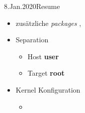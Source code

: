 \documentclass{beamer}
\begin{document}
\begin{frame}{8.Jan.2020}{Resume}
 \begin{itemize}
  \item zusätzliche {\em packages} , 
  \item Separation
  \begin{itemize}
   \item Host {\bf user}
   \item Target {\bf root}
  \end{itemize}
  \item Kernel Konfiguration
  \begin{itemize}
   \item {}
  \end{itemize}
 \end{itemize}
\end{frame}
\end{document}
